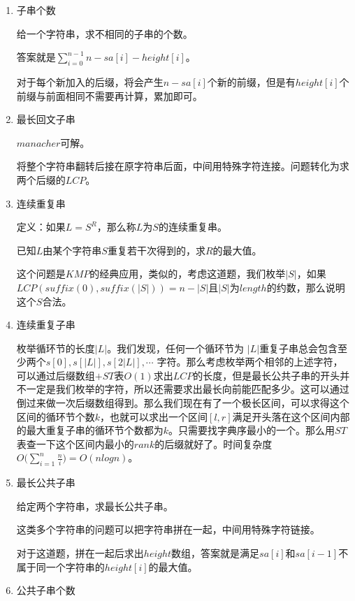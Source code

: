 \documentclass[11pt]{article}
\begin{document}
\begin{enumerate}
\item 子串个数
\label{sec-3-3-3-4}

给一个字符串，求不相同的子串的个数。

答案就是\(\sum_ {i = 0} ^ {n - 1} n - sa[i] - height[i]\)。

对于每个新加入的后缀，将会产生\(n-sa[i]\)个新的前缀，但是有\(height[i]\)个前缀与前面相同不需要再计算，累加即可。

\item 最长回文子串
\label{sec-3-3-3-5}

\(manacher\)可解。

将整个字符串翻转后接在原字符串后面，中间用特殊字符连接。问题转化为求两个后缀的\(LCP\)。

\item 连续重复串
\label{sec-3-3-3-6}

定义：如果\(L=S^R\)，那么称\(L\)为\(S\)的连续重复串。

已知\(L\)由某个字符串\(S\)重复若干次得到的，求\(R\)的最大值。

这个问题是\(KMP\)的经典应用，类似的，考虑这道题，我们枚举\(|S|\)，如果\(LCP(suffix(0),suffix(|S|))=n-|S|\)且\(|S|\)为\(length\)的约数，那么说明这个\(S\)合法。

\item 连续重复子串
\label{sec-3-3-3-7}

枚举循环节的长度\(|L|\)。我们发现，任何一个循环节为 \(|L|\)重复子串总会包含至少两个\(s[0],s[|L|],s[2|L|], \cdots\) 字符。那么考虑枚举两个相邻的上述字符，可以通过后缀数组\(+ST\)表\(O(1)\)求出\(LCP\)的长度，但是最长公共子串的开头并不一定是我们枚举的字符，所以还需要求出最长向前能匹配多少。这可以通过倒过来做一次后缀数组得到。那么我们现在有了一个极长区间，可以求得这个区间的循环节个数\(k\)，也就可以求出一个区间\([l,r]\)满足开头落在这个区间内部的最大重复子串的循环节个数都为\(k\)。只需要找字典序最小的一个。那么用\(ST\)表查一下这个区间内最小的\(rank\)的后缀就好了。时间复杂度\(O\Big(\sum_{i=1}^{n}\frac{n}{i}\Big)=O(nlogn)\)。

\item 最长公共子串
\label{sec-3-3-3-8}

给定两个字符串，求最长公共子串。

这类多个字符串的问题可以把字符串拼在一起，中间用特殊字符链接。

对于这道题，拼在一起后求出\(height\)数组，答案就是满足\(sa[i]\)和\(sa[i-1]\)不属于同一个字符串的\(height[i]\)的最大值。

\item 公共子串个数
\label{sec-3-3-3-9}


\end{enumerate}
\end{document}
